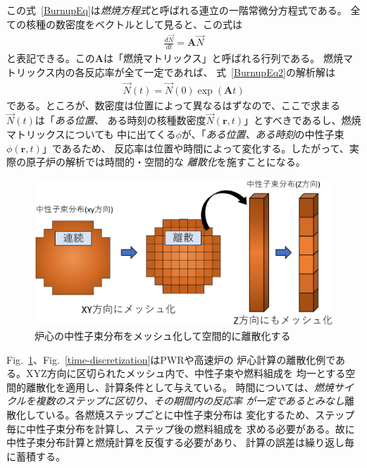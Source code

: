 この式~\eqref{BurnupEq}は\emph{燃焼方程式}と呼ばれる連立の一階常微分方程式である。
全ての核種の数密度をベクトルとして見ると、この式は
\begin{align}
  \frac{d\vec{N}}{dt} = \bm{A} \vec{N}  \label{BurnupEq2}
\end{align}
と表記できる。この$\bm{A}$は「燃焼マトリックス」と呼ばれる行列である。
燃焼マトリックス内の各反応率が全て一定であれば、
式~\eqref{BurnupEq2}の解析解は
\begin{align}
  \vec{N}(t) = \vec{N}(0) \exp{ (\bm{A} t) } \label{BurnupEqAnlSol}
\end{align}
である。ところが、数密度は位置によって異なるはずなので、ここで求まる$\vec{N}(t)$は「\emph{ある位置}、
ある時刻の核種数密度$\vec{N}(\bm{r},t)$」とすべきであるし、燃焼マトリックスについても
中に出てくる$\phi$が、「\emph{ある位置、ある時刻}の中性子束$\phi(\bm{r},t)$」であるため、
反応率は位置や時間によって変化する。したがって、実際の原子炉の解析では時間的・空間的な
\emph{離散化}を施すことになる。
\begin{figure}[htbp]
  \begin{center}
  \includegraphics[width=120mm]{figure/discretization.eps}
  \caption{炉心の中性子束分布をメッシュ化して空間的に離散化する}\label{discretization}
  \end{center}
\end{figure}
Fig.~\ref{discretization}、Fig.~\ref{time-discretization}はPWRや高速炉の
炉心計算の離散化例である。XYZ方向に区切られたメッシュ内で、中性子束や燃料組成を
均一とする空間的離散化を適用し、計算条件として与えている。
時間については、\emph{燃焼サイクルを複数のステップに区切り、その期間内の反応率
が一定であるとみなし}離散化している。各燃焼ステップごとに中性子束分布は
変化するため、ステップ毎に中性子束分布を計算し、ステップ後の燃料組成を
求める必要がある。故に中性子束分布計算と燃焼計算を反復する必要があり、
計算の誤差は繰り返し毎に蓄積する。


